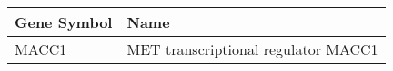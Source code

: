 \begin{tabular}{ll}
\toprule
Gene Symbol &                                Name \\
\midrule
      MACC1 & MET transcriptional regulator MACC1 \\
\bottomrule
\end{tabular}
